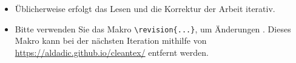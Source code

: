 \begin{itemize}

  \item Üblicherweise erfolgt das Lesen und die Korrektur der Arbeit iterativ.
  \item Bitte verwenden Sie das Makro \verb$\revision{...}$, um Änderungen .
  Dieses Makro kann bei der nächsten Iteration mithilfe von \url{https://aldadic.github.io/cleantex/} entfernt werden.

\end{itemize}
